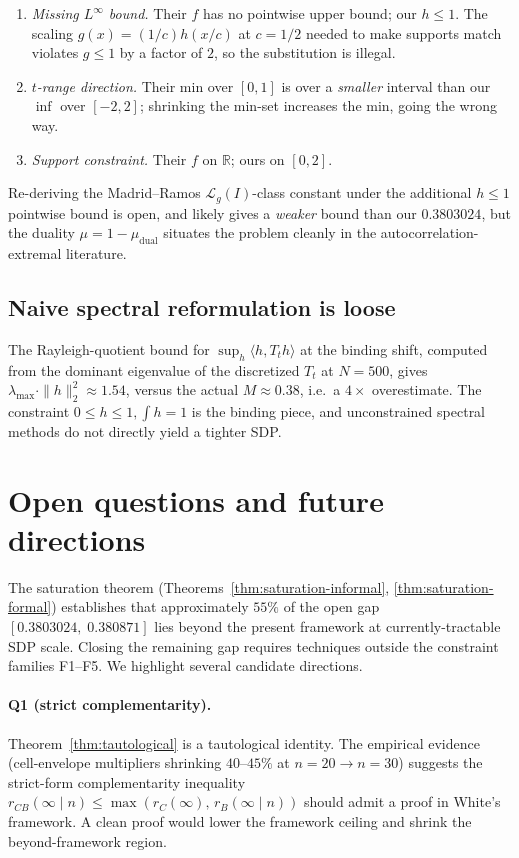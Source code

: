 \documentclass[11pt]{article}
\theoremstyle{plain}
\theoremstyle{definition}
\begin{document}
\begin{enumerate}
\item \emph{Missing $L^\infty$ bound.} Their $f$ has no pointwise upper
bound; our $h \le 1$. The scaling $g(x) = (1/c) h(x/c)$ at $c = 1/2$
needed to make supports match violates $g \le 1$ by a factor of $2$,
so the substitution is illegal.
\item \emph{$t$-range direction.} Their min over $[0, 1]$ is over a
\emph{smaller} interval than our $\inf$ over $[-2, 2]$; shrinking the
min-set increases the min, going the wrong way.
\item \emph{Support constraint.} Their $f$ on $\mathbb{R}$; ours on
$[0, 2]$.
\end{enumerate}

Re-deriving the Madrid--Ramos $\mathcal{L}_g(I)$-class constant under
the additional $h \le 1$ pointwise bound is open, and likely gives a
\emph{weaker} bound than our $0.3803024$, but the duality
$\mu = 1 - \mu_{\mathrm{dual}}$ situates the problem cleanly in the
autocorrelation-extremal literature.

\subsection{Naive spectral reformulation is loose}

The Rayleigh-quotient bound for $\sup_h \langle h, T_t h\rangle$ at
the binding shift, computed from the dominant eigenvalue of the
discretized $T_t$ at $N = 500$, gives $\lambda_{\max} \cdot \|h\|_2^2
\approx 1.54$, versus the actual $M \approx 0.38$, i.e.\ a $4\times$
overestimate. The constraint $0 \le h \le 1, \int h = 1$ is the
binding piece, and unconstrained spectral methods do not directly
yield a tighter SDP.

\section{Open questions and future directions}\label{sec:open}

The saturation theorem
(Theorems~\ref{thm:saturation-informal}, \ref{thm:saturation-formal})
establishes that approximately $55\%$ of the open gap
$[0.3803024,\; 0.380871]$ lies beyond the present framework at
currently-tractable SDP scale. Closing the remaining gap requires
techniques outside the constraint families F1--F5. We highlight
several candidate directions.

\paragraph{Q1 (strict complementarity).}
Theorem~\ref{thm:tautological} is a tautological identity. The
empirical evidence (cell-envelope multipliers shrinking $40$--$45\%$
at $n = 20 \to n = 30$) suggests the strict-form complementarity
inequality
\(
r_{CB}(\infty \mid n) \le \max(r_C(\infty),\, r_B(\infty \mid n))
\)
should admit a proof in White's framework. A clean proof would lower
the framework ceiling and shrink the beyond-framework region.
\end{document}
